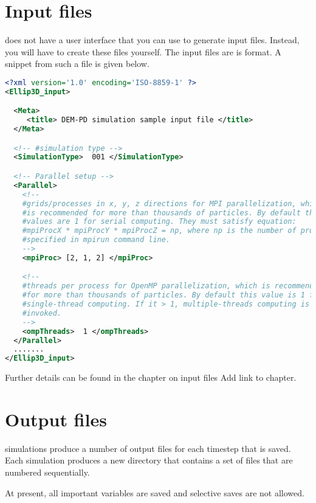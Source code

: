 \documentclass[11pt,fleqn]{book} %
\begin{document}
\section{Input files}
\GranularSim does not have a user interface that you can use to generate input files.
Instead, you will have to create these files yourself.  The input files are is 
format.  A snippet from such a file is given below.
\begin{lstlisting}[language=XML]
<?xml version='1.0' encoding='ISO-8859-1' ?>
<Ellip3D_input>

  <Meta>
     <title> DEM-PD simulation sample input file </title>
  </Meta>

  <!-- #simulation type -->
  <SimulationType>  001 </SimulationType>

  <!-- Parallel setup -->
  <Parallel>
    <!--
    #grids/processes in x, y, z directions for MPI parallelization, which
    #is recommended for more than thousands of particles. By default these
    #values are 1 for serial computing. They must satisfy equation:
    #mpiProcX * mpiProcY * mpiProcZ = np, where np is the number of processes
    #specified in mpirun command line.
    -->
    <mpiProc> [2, 1, 2] </mpiProc>

    <!--
    #threads per process for OpenMP parallelization, which is recommended 
    #for more than thousands of particles. By default this value is 1 for 
    #single-thread computing. If it > 1, multiple-threads computing is 
    #invoked.
    -->
    <ompThreads>  1 </ompThreads>
  </Parallel>
  .......
</Ellip3D_input>
\end{lstlisting}
Further details can be found in the chapter on input files {\Red Add link to chapter}.

\section{Output files}
\GranularSim simulations produce a number of output files for each timestep that is
saved.   Each simulation produces a new directory that contains a set of files that
are numbered sequentially. 
\begin{WarningBox}
At present, all important variables are saved and selective saves are not allowed.
\end{WarningBox}
\end{document}
